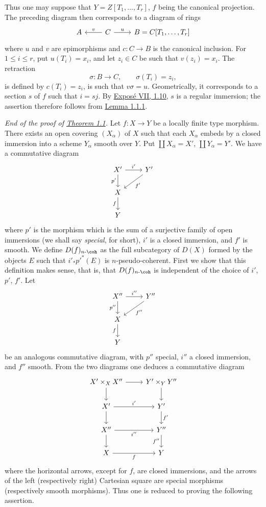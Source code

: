 Thus one may suppose that \(Y=Z[T_1,\ldots,T_r]\), \(f\) being the canonical projection. The preceding diagram then corresponds to a diagram of rings
\[
\begin{tikzcd}
A & C \arrow[l,"v"'] \arrow[r,"u"] & B=C[T_1,\ldots,T_r]
\end{tikzcd}
\]
where \(u\) and \(v\) are epimorphisms and \(c:C\to B\) is the canonical inclusion. For \(1\leq i\leq r\), put \(u(T_i)=x_i\), and let \(z_i\in C\) be such that \(v(z_i)=x_i\). The retraction
\[
  \sigma:B\longrightarrow C,\qquad \sigma(T_i)=z_i,
\]
is defined by \(c(T_i)=z_i\), is such that \(v\sigma=u\). Geometrically, it corresponds to a section \(s\) of \(f\) such that \(i=sj\). By \hyperlink{sga6.e07.prop.1-10}{Exposé VII, 1.10}, \(s\) is a regular immersion; the assertion therefore follows from \hyperlink{sga6.e03.lem.1-1-1}{Lemma 1.1.1}.

\emph{End of the proof of \hyperlink{sga6.e03.thm.1-1}{Theorem 1.1}.} Let \(f:X\to Y\) be a locally finite type morphism. There exists an open covering \((X_\alpha)\) of \(X\) such that each \(X_\alpha\) embeds by a closed immersion into a scheme \(Y_\alpha\) smooth over \(Y\). Put \(\coprod X_\alpha=X'\), \(\coprod Y_\alpha=Y'\). We have a commutative diagram
\[
\begin{tikzcd}
X' \arrow[r,"i'"] \arrow[d,"p'"'] & Y' \arrow[dl,"f'"]\\
X \arrow[d,"f"']\\
Y
\end{tikzcd}
\]
where \(p'\) is the morphism which is the sum of a surjective family of open immersions (we shall say \emph{special}, for short), \(i'\) is a closed immersion, and \(f'\) is smooth. We define \(D(f)_{n\text{-}\coh}\) as the full subcategory of \(D(X)\) formed by the objects \(E\) such that \(i'_*p'^*(E)\) is \(n\)-pseudo-coherent. First we show that this definition makes sense, that is, that \(D(f)_{n\text{-}\coh}\) is independent of the choice of \(i'\), \(p'\), \(f'\). Let
\[
\begin{tikzcd}
X'' \arrow[r,"i''"] \arrow[d,"p''"'] & Y'' \arrow[dl,"f''"]\\
X \arrow[d,"f"']\\
Y
\end{tikzcd}
\]
be an analogous commutative diagram, with \(p''\) special, \(i''\) a closed immersion, and \(f''\) smooth. From the two diagrams one deduces a commutative diagram
\[
\begin{tikzcd}
X'\times_X X'' \arrow[r] \arrow[d] & Y'\times_Y Y'' \arrow[d]\\
X' \arrow[r,"i'"] \arrow[d] & Y' \arrow[d,"f'"]\\
X'' \arrow[r,"i''"'] \arrow[d] & Y'' \arrow[d,"f''"']\\
X \arrow[r,"f"'] & Y
\end{tikzcd}
\]
where the horizontal arrows, except for \(f\), are closed immersions, and the arrows of the left (respectively right) Cartesian square are special morphisms (respectively smooth morphisms). Thus one is reduced to proving the following assertion.

